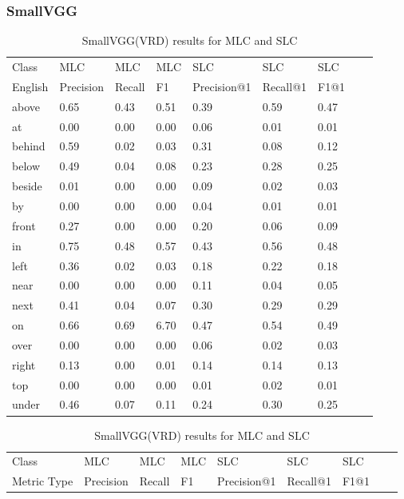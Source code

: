 \documentclass{csfyp}
\begin{document}
\subsubsection{SmallVGG}
\begin{table}[!htbp]
\centering
\begin{tabular}{|l|l|l|l|l|l|l|l|l}
\cline{1-7}
Class   &  MLC  &  MLC  &  MLC & SLC &  SLC & SLC \\ \cline{1-7}
English & Precision &  Recall   & F1 & Precision@1 & Recall@1 & F1@1 \\ \cline{1-7}
above	&	0.65	&	0.43	&	0.51	&	0.39	&	0.59	&	0.47  \\ \cline{1-7}
at	    &	0.00	&	0.00	&	0.00	&	0.06	&	0.01	&	0.01  \\ \cline{1-7}
behind	&	0.59	&	0.02	&	0.03	&	0.31	&	0.08	&	0.12  \\ \cline{1-7}
below	&	0.49	&	0.04	&	0.08	&	0.23	&	0.28	&	0.25  \\ \cline{1-7}
beside	&	0.01	&	0.00	&	0.00	&	0.09	&	0.02	&	0.03  \\ \cline{1-7}
by	    &	0.00	&	0.00	&	0.00	&	0.04	&	0.01	&	0.01  \\ \cline{1-7}
front	&	0.27	&	0.00	&	0.00	&	0.20	&	0.06	&	0.09  \\ \cline{1-7}
in	    &	0.75	&	0.48	&	0.57	&	0.43	&	0.56	&	0.48  \\ \cline{1-7}
left	&	0.36	&	0.02	&	0.03	&	0.18	&	0.22	&	0.18  \\ \cline{1-7}
near	&	0.00	&	0.00	&	0.00	&	0.11	&	0.04	&	0.05  \\ \cline{1-7}
next	&	0.41	&	0.04	&	0.07	&	0.30	&	0.29	&	0.29  \\ \cline{1-7}
on	    &	0.66	&	0.69	&	6.70	&	0.47	&	0.54	&	0.49  \\ \cline{1-7}
over	&	0.00	&	0.00	&	0.00	&	0.06	&	0.02	&	0.03  \\ \cline{1-7}
right	&	0.13	&	0.00	&	0.01	&	0.14	&	0.14	&	0.13  \\ \cline{1-7} 
top	    &	0.00	&	0.00	&	0.00	&	0.01	&	0.02	&	0.01  \\ \cline{1-7} 
under	&	0.46	&	0.07	&	0.11	&	0.24	&	0.30	&	0.25  \\ \cline{1-7} 
\end{tabular}
\caption{SmallVGG(VRD) results for MLC and SLC}
\centering
\begin{tabular}{|l|l|l|l|l|l|l|l|l}
\cline{1-7}
Class &  MLC  &  MLC  &  MLC & SLC &  SLC & SLC \\ \cline{1-7}
Metric Type  & Precision &  Recall & F1 & Precision@1 & Recall@1 & F1@1 \\ \cline{1-7}

\end{tabular}
\end{table}
\end{document}
